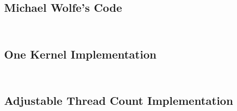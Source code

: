 \documentclass[10pt]{article}
\begin{document}
\subsection{Michael Wolfe's Code}
\inputminted[linenos, fontsize=\footnotesize]{c}{../jacobi_final/original_jacobi5.cu}
\inputminted[linenos, fontsize=\footnotesize]{c}{../jacobi_final/original_jacobi6.cu}

\subsection{One Kernel Implementation}
\inputminted[linenos, fontsize=\footnotesize]{c}{../jacobi_final/1k_jacobi5.cu}
\inputminted[linenos, fontsize=\footnotesize]{c}{../jacobi_final/1k_jacobi6.cu}

\subsection{Adjustable Thread Count Implementation}
\inputminted[linenos, fontsize=\footnotesize]{c}{../jacobi_final/orig_J6M_v2.cu}
\inputminted[linenos, fontsize=\footnotesize]{c}{../jacobi_final/1k_J6M_v2.cu}
\end{document}
